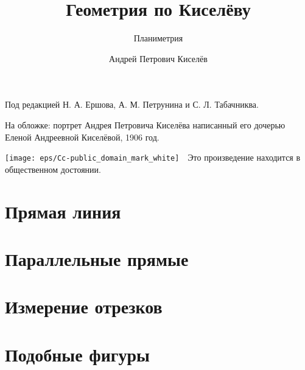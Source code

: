\documentclass[twoside]{book}
\begin{document}
\cleardoublepage
\frontmatter
\title{Геометрия по Киселёву}
\subtitle{Планиметрия}
\author{Андрей Петрович Киселёв
}
\date{}
\maketitle

\thispagestyle{empty}

Под редакцией Н. А. Ершова, А. М. Петрунина и С. Л. Табачниква.

На обложке: портрет  Андрея Петровича Киселёва написанный его дочерью Еленой Андреевной Киселёвой, 1906 год.

\vfill
\noindent
\texttt{[image: eps/Cc-public\_domain\_mark\_white]}\ \ 
Это произведение находится в общественном достоянии.

\mainmatter





\chapter{Прямая линия}





\chapter{Параллельные прямые}










\chapter{Измерение отрезков}



\chapter{Подобные фигуры}







\end{document}
